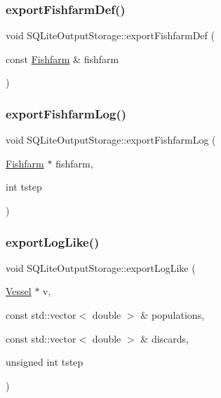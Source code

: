\mbox{\label{class_s_q_lite_output_storage_a2731d3d98f84fa12e91dfb06061448b8}} 
\subsubsection{\texorpdfstring{exportFishfarmDef()}{exportFishfarmDef()}}
{\footnotesize\ttfamily void S\+Q\+Lite\+Output\+Storage\+::export\+Fishfarm\+Def (\begin{DoxyParamCaption}\item[{const \mbox{\hyperlink{class_fishfarm}{Fishfarm}} \&}]{fishfarm }\end{DoxyParamCaption})}

\mbox{\label{class_s_q_lite_output_storage_a22848a682fdd77dac3444f07a75079f5}} 
\subsubsection{\texorpdfstring{exportFishfarmLog()}{exportFishfarmLog()}}
{\footnotesize\ttfamily void S\+Q\+Lite\+Output\+Storage\+::export\+Fishfarm\+Log (\begin{DoxyParamCaption}\item[{\mbox{\hyperlink{class_fishfarm}{Fishfarm}} $\ast$}]{fishfarm,  }\item[{int}]{tstep }\end{DoxyParamCaption})}

\mbox{\label{class_s_q_lite_output_storage_ab7d95ccbd7baf589d2c65ef0539bac08}} 
\subsubsection{\texorpdfstring{exportLogLike()}{exportLogLike()}}
{\footnotesize\ttfamily void S\+Q\+Lite\+Output\+Storage\+::export\+Log\+Like (\begin{DoxyParamCaption}\item[{\mbox{\hyperlink{class_vessel}{Vessel}} $\ast$}]{v,  }\item[{const std\+::vector$<$ double $>$ \&}]{populations,  }\item[{const std\+::vector$<$ double $>$ \&}]{discards,  }\item[{unsigned int}]{tstep }\end{DoxyParamCaption})}

